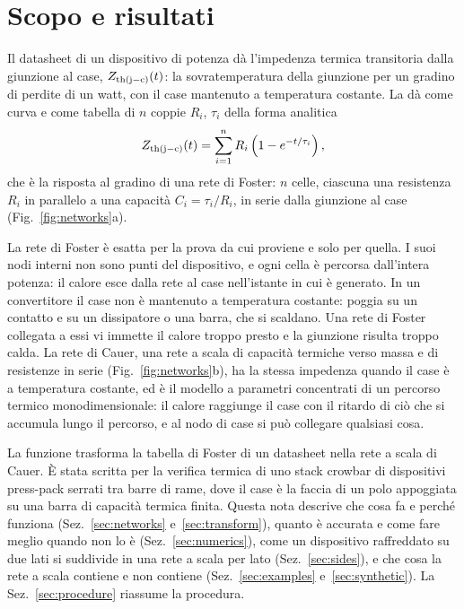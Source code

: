 \documentclass[10pt,a4paper]{scrartcl}
\let\newcommand\fcitdefine
\newcommand{\Zjc}{Z_\mathrm{th(j-c)}}
\newcommand{\code}[1]{\texttt{#1}}
\begin{document}

\tableofcontents
\newpage

\section{Scopo e risultati}
\label{sec:scope}
Il datasheet di un dispositivo di potenza dà l'impedenza termica transitoria dalla giunzione al case, $\Zjc(t)$: la sovratemperatura della giunzione per un gradino di perdite di un watt, con il case mantenuto a temperatura costante. La dà come curva e come tabella di $n$ coppie $R_i$, $\tau_i$ della forma analitica
\begin{equation}
\Zjc(t) = \sum_{i=1}^{n} R_i \left(1 - e^{-t/\tau_i}\right) ,
\label{eq:zth}
\end{equation}
che è la risposta al gradino di una rete di Foster: $n$ celle, ciascuna una resistenza $R_i$ in parallelo a una capacità $C_i = \tau_i/R_i$, in serie dalla giunzione al case (Fig.~\ref{fig:networks}a).

La rete di Foster è esatta per la prova da cui proviene e solo per quella. I suoi nodi interni non sono punti del dispositivo, e ogni cella è percorsa dall'intera potenza: il calore esce dalla rete al case nell'istante in cui è generato. In un convertitore il case non è mantenuto a temperatura costante: poggia su un contatto e su un dissipatore o una barra, che si scaldano. Una rete di Foster collegata a essi vi immette il calore troppo presto e la giunzione risulta troppo calda. La rete di Cauer, una rete a scala di capacità termiche verso massa e di resistenze in serie (Fig.~\ref{fig:networks}b), ha la stessa impedenza quando il case è a temperatura costante, ed è il modello a parametri concentrati di un percorso termico monodimensionale: il calore raggiunge il case con il ritardo di ciò che si accumula lungo il percorso, e al nodo di case si può collegare qualsiasi cosa.

La funzione  trasforma la tabella di Foster di un datasheet nella rete a scala di Cauer. È stata scritta per la verifica termica di uno stack crowbar di dispositivi press-pack serrati tra barre di rame, dove il case è la faccia di un polo appoggiata su una barra di capacità termica finita. Questa nota descrive che cosa fa e perché funziona (Sez.~\ref{sec:networks} e~\ref{sec:transform}), quanto è accurata e come fare meglio quando non lo è (Sez.~\ref{sec:numerics}), come un dispositivo raffreddato su due lati si suddivide in una rete a scala per lato (Sez.~\ref{sec:sides}), e che cosa la rete a scala contiene e non contiene (Sez.~\ref{sec:examples} e~\ref{sec:synthetic}). La Sez.~\ref{sec:procedure} riassume la procedura.
\end{document}
